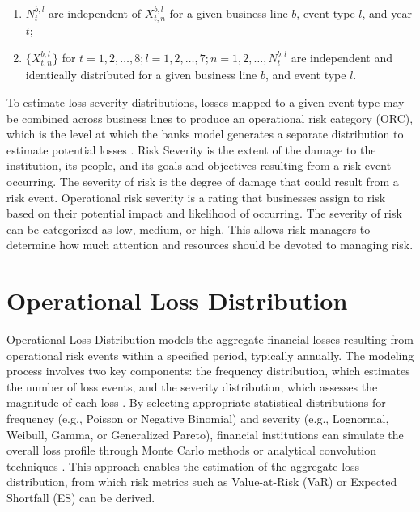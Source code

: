 \begin{enumerate}
    \item \( N_t^{b,l} \) are independent of \( X_{t,n}^{b,l} \) for a given business line \(b\), event type \(l\), and year \(t\);
    \item \( \{X_{t,n}^{b,l}\} \) for \( t = 1,2,\dots,8; l=1,2,\dots,7; n=1,2,\dots,N_t^{b,l} \) are independent and identically distributed for a given business line \(b\), and event type \(l\).
\end{enumerate}

To estimate loss severity distributions, losses mapped to a given event type may be combined across business lines to produce an operational risk category (ORC), which is the level at which the banks model generates a separate distribution to estimate potential losses \parencite{hadley_selection_2019}.
Risk Severity is the extent of the damage to the institution, its people, and its goals and objectives resulting from a risk event occurring. The severity of risk is the degree of damage that could result from a risk event. Operational risk severity is a rating that businesses assign to risk based on their potential impact and likelihood of occurring. The severity of risk can be categorized as low, medium, or high. This allows risk managers to determine how much attention and resources should be devoted to managing risk.

\section*{Operational Loss Distribution}

Operational Loss Distribution models the aggregate financial losses resulting from operational risk events within a specified period, typically annually. The modeling process involves two key components: the frequency distribution, which estimates the number of loss events, and the severity distribution, which assesses the magnitude of each loss \parencite{cohen_estimating_2024}. By selecting appropriate statistical distributions for frequency (e.g., Poisson or Negative Binomial) and severity (e.g., Lognormal, Weibull, Gamma, or Generalized Pareto), financial institutions can simulate the overall loss profile through Monte Carlo methods or analytical convolution techniques \parencite{hadley_selection_2019}. This approach enables the estimation of the aggregate loss distribution, from which risk metrics such as Value-at-Risk (VaR) or Expected Shortfall (ES) can be derived. 

